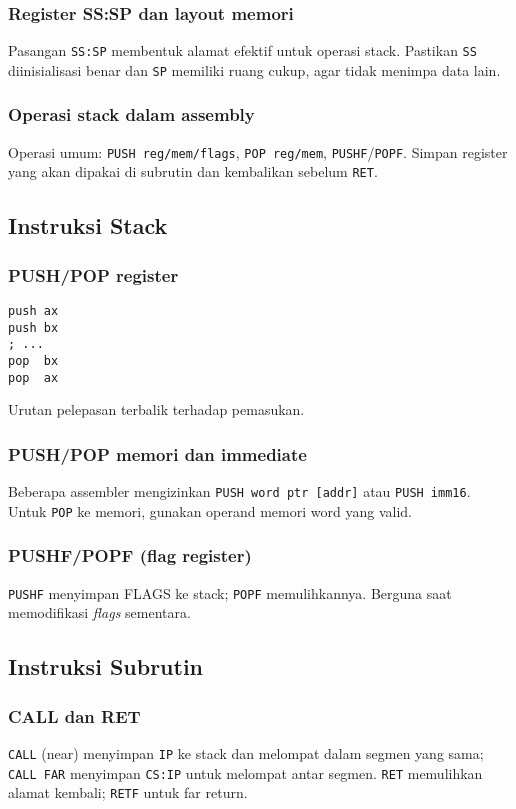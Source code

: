 \subsubsection{Register SS:SP dan layout memori}
Pasangan \texttt{SS:SP} membentuk alamat efektif untuk operasi stack. Pastikan \texttt{SS} diinisialisasi benar dan \texttt{SP} memiliki ruang cukup, agar tidak menimpa data lain.

\subsubsection{Operasi stack dalam assembly}
Operasi umum: \texttt{PUSH reg/mem/flags}, \texttt{POP reg/mem}, \texttt{PUSHF}/\texttt{POPF}. Simpan register yang akan dipakai di subrutin dan kembalikan sebelum \texttt{RET}.

\subsection{Instruksi Stack}
\subsubsection{PUSH/POP register}
\begin{verbatim}
push ax
push bx
; ...
pop  bx
pop  ax
\end{verbatim}
Urutan pelepasan terbalik terhadap pemasukan.

\subsubsection{PUSH/POP memori dan immediate}
Beberapa assembler mengizinkan \texttt{PUSH word ptr [addr]} atau \texttt{PUSH imm16}. Untuk \texttt{POP} ke memori, gunakan operand memori word yang valid.

\subsubsection{PUSHF/POPF (flag register)}
\texttt{PUSHF} menyimpan FLAGS ke stack; \texttt{POPF} memulihkannya. Berguna saat memodifikasi \textit{flags} sementara.

\subsection{Instruksi Subrutin}
\subsubsection{CALL dan RET}
\texttt{CALL} (near) menyimpan \texttt{IP} ke stack dan melompat dalam segmen yang sama; \texttt{CALL FAR} menyimpan \texttt{CS:IP} untuk melompat antar segmen. \texttt{RET} memulihkan alamat kembali; \texttt{RETF} untuk far return.

